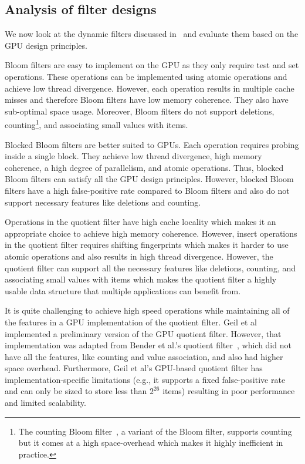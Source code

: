 \subsection{Analysis of filter designs}

We now look at the dynamic filters discussed in~ and evaluate them based on the GPU design principles. 

Bloom filters are easy to implement on the GPU as they only require test and set operations. These operations can be implemented using atomic operations and achieve low thread divergence. However, each operation results in multiple cache misses and therefore Bloom filters have low memory coherence. They also have sub-optimal space usage. Moreover, Bloom filters do not support deletions, counting\footnote{The counting Bloom filter~\cite{FanCaAl00}, a variant of the Bloom filter, supports counting but it comes at a high space-overhead which makes it highly inefficient in practice.}, and associating small values with items.

Blocked Bloom filters are better suited to GPUs.
Each operation requires probing inside a single block. They achieve low thread divergence, high memory coherence, a high degree of parallelism, and atomic operations. Thus, blocked Bloom filters can satisfy all the GPU design principles. However, blocked Bloom filters have a high false-positive rate compared to Bloom filters and also do not support necessary features like deletions and counting.

Operations in the quotient filter have high cache locality which makes it an appropriate choice to achieve high memory coherence. However, insert operations in the quotient filter requires shifting fingerprints which makes it harder to use atomic operations and also results in high thread divergence. However, the quotient filter can support all the necessary features like deletions, counting, and associating small values with items which makes the quotient filter a highly usable data structure that multiple applications can benefit from. 

It is quite challenging to achieve high speed operations while maintaining all of the features in a GPU implementation of the quotient filter. Geil et al~\cite{GeilFO18} implemented a preliminary version of the GPU quotient filter. However, that implementation was adapted from Bender et al.'s quotient filter~\cite{BenderFaJo12a}, which did not have all the features, like counting and value association, and also had higher space overhead. Furthermore, Geil et al's GPU-based quotient filter has implementation-specific limitations (e.g., it supports a fixed false-positive rate and can only be sized to store less than $2^{26}$ items) resulting in poor performance and limited scalability.

